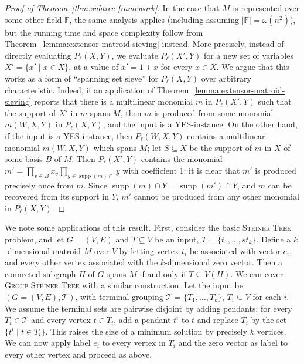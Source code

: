 \documentclass{theoretics}
\newcommand{\F}{\ensuremath{\mathbb F}\xspace}
\newcommand{\cT}{\ensuremath{\mathcal T}\xspace}
\DeclareMathOperator{\supp}{supp}
\begin{document}
\begin{proof}[Proof of Theorem~\ref{thm:subtree-framework}]
  In the case that $M$ is represented over some other field $\F$, the same
  analysis applies (including assuming $|\F| = \omega(n^2)$), but the 
  running time and space complexity follow from
  Theorem~\ref{lemma:extensor-matroid-sieving} instead.
  More precisely, instead of directly evaluating $P_\ell(X,Y)$,
  we evaluate $P_\ell(X',Y)$ for a new set of variables $X'=\{x' \mid x \in X\}$,
  at a value of $x'=1+x$ for every $x \in X$. We argue that 
  this works as a form of ``spanning set sieve'' for $P_\ell(X,Y)$
  over arbitrary characteristic. Indeed, if an application
  of Theorem~\ref{lemma:extensor-matroid-sieving} reports that
  there is a multilinear monomial $m$ in $P_\ell(X',Y)$ such that the support
  of $X'$ in $m$ spans $M$, then $m$ is produced from some monomial
  $m(W,X,Y)$ in $P_\ell(X,Y)$, and the input is a YES-instance.
  On the other hand, if the input is a YES-instance, then 
  $P_\ell(W,X,Y)$ contains a multilinear monomial $m(W,X,Y)$
  which spans $M$; let $S \subseteq X$ be the support of $m$ in $X$
  of some basis $B$ of $M$. Then $P_\ell(X',Y)$ contains the monomial
  $m'=\prod_{v \in B} x_v \prod_{y \in \supp(m) \cap} y$ with coefficient 1:
  it is clear that $m'$ is produced precisely once from $m$. 
  Since $\supp(m) \cap Y = \supp(m') \cap Y$, and $m$ can be recovered from
  its support in $Y$, $m'$ cannot be produced from any other
  monomial in $P_\ell(X,Y)$. 
\end{proof}

We note some applications of this result. First, consider the basic
\textsc{Steiner Tree} problem, and let $G=(V,E)$ and $T \subseteq V$
be an input, $T=\{t_1,\ldots,st_k\}$. Define a $k$-dimensional matroid
$M$ over $V$ by letting vertex $t_i$ be associated with vector $e_i$,
and every other vertex associated with the $k$-dimensional zero
vector. Then a connected subgraph $H$ of $G$ spans $M$ if and only if
$T \subseteq V(H)$. We can cover \textsc{Group Steiner Tree} with a
similar construction. Let the input be $(G=(V,E), \cT)$, with
terminal grouping $\cT=\{T_1,\ldots,T_k\}$, $T_i \subseteq V$ for each $i$.
We assume the terminal sets are pairwise disjoint by adding pendants:
for every $T_i \in \cT$ and every vertex $t \in T_i$, add a pendant
$t^i$ to $t$ and replace $T_i$ by the set $\{t^i \mid t \in T_i\}$. 
This raises the size of a minimum solution by precisely $k$ vertices.
We can now apply label $e_i$ to every vertex in $T_i$ and the zero vector
as label to every other vertex and proceed as above.
\end{document}
